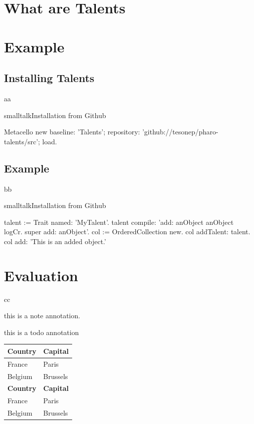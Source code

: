 \documentclass[10pt,twoside,english]{_support/latex/sbabook/sbabook}
\begin{document}
\section{What are Talents}\section{Example}\subsection{Installing Talents}
aa

\begin{listing}[float, label=install]{smalltalk}{Installation from Github}

Metacello new
  baseline: 'Talents';
  repository: 'github://tesonep/pharo-talents/src';
  load.
\end{listing}
\subsection{Example}
bb

\begin{listing}[float, label=talent-example]{smalltalk}{Installation from Github}

talent := Trait named: 'MyTalent'.
talent compile: 'add: anObject
anObject logCr.
super add: anObject'.
col := OrderedCollection new.
col addTalent: talent.
col add: 'This is an added object.'
\end{listing}
\section{Evaluation}
cc

\begin{note}
this is a note annotation.
\end{note}

\begin{todo}
this is a todo annotation
\end{todo}

\begin{tabular}{ll}
\toprule
\textbf{Country} & \textbf{Capital} \\
\midrule
France & Paris \\
Belgium & Brussels \\
\textbf{Country} & \textbf{Capital} \\
\midrule
France & Paris \\
Belgium & Brussels \\
\bottomrule
\end{tabular}
\end{document}
